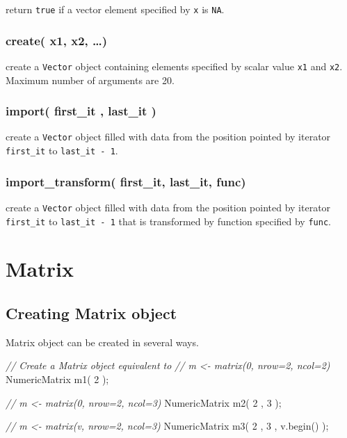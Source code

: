 \documentclass[]{book}
\newenvironment{Shaded}{\begin{snugshade}}{\end{snugshade}}
\newcommand{\DecValTok}[1]{\textcolor[rgb]{0.00,0.00,0.81}{#1}}
\newcommand{\CommentTok}[1]{\textcolor[rgb]{0.56,0.35,0.01}{\textit{#1}}}
\newcommand{\NormalTok}[1]{#1}
\theoremstyle{definition}
\theoremstyle{definition}
\theoremstyle{remark}
\begin{document}
return \texttt{true} if a vector element specified by \texttt{x} is
\texttt{NA}.

\subsection{create( x1, x2, \ldots{})}\label{create-x1-x2}

create a \texttt{Vector} object containing elements specified by scalar
value \texttt{x1} and \texttt{x2}. Maximum number of arguments are 20.

\subsection{import( first\_it , last\_it
)}\label{import-first_it-last_it}

create a \texttt{Vector} object filled with data from the position
pointed by iterator \texttt{first\_it} to \texttt{last\_it\ -\ 1}.

\subsection{import\_transform( first\_it, last\_it,
func)}\label{import_transform-first_it-last_it-func}

create a \texttt{Vector} object filled with data from the position
pointed by iterator \texttt{first\_it} to \texttt{last\_it\ -\ 1} that
is transformed by function specified by \texttt{func}.

\chapter{Matrix}\label{matrix}

\section{Creating Matrix object}\label{creating-matrix-object}

Matrix object can be created in several ways.

\begin{Shaded}
\begin{Highlighting}[]
\CommentTok{// Create a Matrix object equivalent to}
\CommentTok{// m <- matrix(0, nrow=2, ncol=2)}
\NormalTok{NumericMatrix m1( }\DecValTok{2}\NormalTok{ );}

\CommentTok{// m <- matrix(0, nrow=2, ncol=3)}
\NormalTok{NumericMatrix m2( }\DecValTok{2}\NormalTok{ , }\DecValTok{3}\NormalTok{ );}

\CommentTok{// m <- matrix(v, nrow=2, ncol=3)}
\NormalTok{NumericMatrix m3( }\DecValTok{2}\NormalTok{ , }\DecValTok{3}\NormalTok{ , v.begin() );}
\end{Highlighting}
\end{Shaded}
\end{document}
